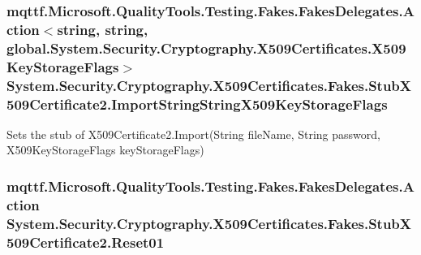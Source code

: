 \hypertarget{class_system_1_1_security_1_1_cryptography_1_1_x509_certificates_1_1_fakes_1_1_stub_x509_certificate2_a748988e2ade0cbbad5074b759a9810a3}{
\subsubsection[{Import\-String\-String\-X509\-Key\-Storage\-Flags}]{\setlength{\rightskip}{0pt plus 5cm}mqttf.\-Microsoft.\-Quality\-Tools.\-Testing.\-Fakes.\-Fakes\-Delegates.\-Action$<$string, string, global.\-System.\-Security.\-Cryptography.\-X509\-Certificates.\-X509\-Key\-Storage\-Flags$>$ System.\-Security.\-Cryptography.\-X509\-Certificates.\-Fakes.\-Stub\-X509\-Certificate2.\-Import\-String\-String\-X509\-Key\-Storage\-Flags}}\label{class_system_1_1_security_1_1_cryptography_1_1_x509_certificates_1_1_fakes_1_1_stub_x509_certificate2_a748988e2ade0cbbad5074b759a9810a3}


Sets the stub of X509\-Certificate2.\-Import(\-String file\-Name, String password, X509\-Key\-Storage\-Flags key\-Storage\-Flags)

\hypertarget{class_system_1_1_security_1_1_cryptography_1_1_x509_certificates_1_1_fakes_1_1_stub_x509_certificate2_aa68614b40e52283e1f991d09705c85f6}{
\subsubsection[{Reset01}]{\setlength{\rightskip}{0pt plus 5cm}mqttf.\-Microsoft.\-Quality\-Tools.\-Testing.\-Fakes.\-Fakes\-Delegates.\-Action System.\-Security.\-Cryptography.\-X509\-Certificates.\-Fakes.\-Stub\-X509\-Certificate2.\-Reset01}}\label{class_system_1_1_security_1_1_cryptography_1_1_x509_certificates_1_1_fakes_1_1_stub_x509_certificate2_aa68614b40e52283e1f991d09705c85f6}


